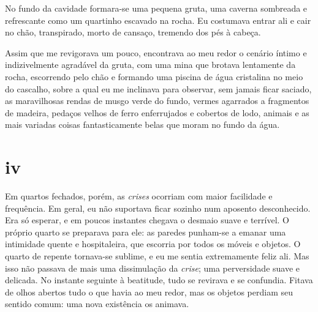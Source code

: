 
No fundo da cavidade formara-se uma pequena gruta, uma caverna sombreada e
refrescante como um quartinho escavado na rocha. Eu costumava entrar ali e
cair no chão, transpirado, morto de cansaço, tremendo dos pés à cabeça.

Assim que me revigorava um pouco, encontrava ao meu redor o cenário íntimo e
indizivelmente agradável da gruta, com uma mina que brotava lentamente da
rocha, escorrendo pelo chão e formando uma piscina de água cristalina no meio
do cascalho, sobre a qual eu me inclinava para observar, sem jamais ficar
saciado, as maravilhosas rendas de musgo verde do fundo, vermes agarrados a
fragmentos de madeira, pedaços velhos de ferro enferrujados e cobertos de
lodo, animais e as mais variadas coisas fantasticamente belas que moram no
fundo da água.

\section{iv} 

 

Em quartos fechados, porém, as \textit{crises} ocorriam com maior facilidade e
frequência. Em geral, eu não suportava ficar sozinho num aposento
desconhecido. Era só esperar, e em poucos instantes chegava o desmaio suave e
terrível. O próprio quarto se preparava para ele: as paredes punham-se a
emanar uma intimidade quente e hospitaleira, que escorria por todos os móveis
e objetos. O quarto de repente tornava-se sublime, e eu me sentia
extremamente feliz ali. Mas isso não passava de mais uma dissimulação
da \textit{crise}; uma perversidade suave e delicada. No instante seguinte à
beatitude, tudo se revirava e se confundia. Fitava de olhos abertos tudo o
que havia ao meu redor, mas os objetos perdiam seu sentido comum: uma nova
existência os animava.



